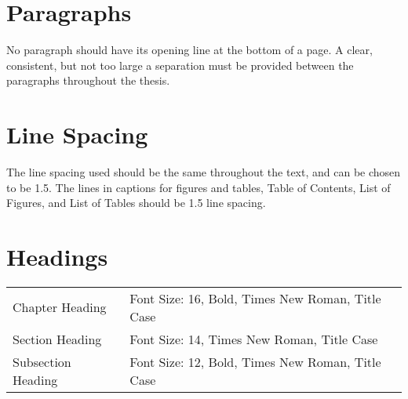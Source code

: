 \section{Paragraphs} 
No paragraph should have its opening line at the bottom of a page. A clear, consistent, but not too large a separation must be provided between the paragraphs throughout the thesis. 

\section{Line Spacing}
The line spacing used should be the same throughout the text, and can be chosen to be 1.5. The lines in captions for figures and tables, Table of Contents, List of Figures, and List of Tables should be 1.5 line spacing. 

\section{Headings}
\begin{table}[htb]
	\begin{tabular}{ll}
		Chapter Heading & Font Size: 16, Bold, Times New Roman, Title Case \\
		Section Heading & Font Size: 14, Times New Roman, Title Case \\
		Subsection Heading & Font Size: 12, Bold, Times New Roman, Title Case
	\end{tabular}	
\end{table}


	
	

